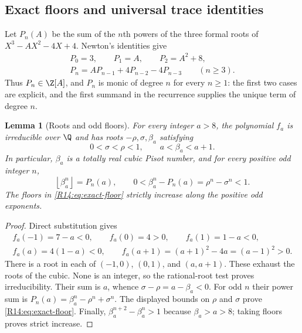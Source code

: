 \documentclass[11pt,a4paper]{article}
\newtheorem{lemma}[theorem]{Lemma}\newtheorem{proposition}[theorem]{Proposition}
\theoremstyle{definition}\newtheorem{definition}[theorem]{Definition}
\theoremstyle{remark}\newtheorem{remark}[theorem]{Remark}
\newcommand{\floor}[1]{\left\lfloor#1\right\rfloor}
\begin{document}
\subsection{Exact floors and universal trace identities}

Let $P_n(A)$ be the sum of the $n$th powers of the three formal roots
of $X^3-AX^2-4X+4$. Newton's identities give
\begin{equation}\label{R14:eq:trace-recurrence}
 \begin{gathered}
 P_0=3,\qquad P_1=A,\qquad P_2=A^2+8,\\
 P_n=A P_{n-1}+4P_{n-2}-4P_{n-3}\qquad(n\ge3).
 \end{gathered}
\end{equation}
Thus $P_n\in\Z[A]$, and $P_n$ is monic of degree $n$ for every
$n\ge1$: the first two cases are explicit, and the first summand
in the recurrence supplies the unique term of degree $n$.

\begin{lemma}[Roots and odd floors]\label{R14:lem:odd-floors}
For every integer $a>8$, the polynomial $f_a$ is irreducible over
$\Q$ and has roots $-\rho,\sigma,\beta_a$ satisfying
\[
 0<\sigma<\rho<1,\qquad a<\beta_a<a+1.
\]
In particular, $\beta_a$ is a totally real cubic Pisot number, and
for every positive odd integer $n$,
\begin{equation}\label{R14:eq:exact-floor}
 \floor{\beta_a^n}=P_n(a),\qquad
 0<\beta_a^n-P_n(a)=\rho^n-\sigma^n<1.
\end{equation}
The floors in \eqref{R14:eq:exact-floor} strictly increase along the
positive odd exponents.
\end{lemma}

\begin{proof}
Direct substitution gives
\[
 \begin{gathered}
 f_a(-1)=7-a<0,\qquad f_a(0)=4>0,\qquad f_a(1)=1-a<0,\\
 f_a(a)=4(1-a)<0,\qquad
 f_a(a+1)=(a+1)^2-4a=(a-1)^2>0.
 \end{gathered}
\]
There is a root in each of $(-1,0)$, $(0,1)$, and $(a,a+1)$.
These exhaust the roots of the cubic. None is an integer, so the
rational-root test proves irreducibility. Their sum is $a$, whence
$\sigma-\rho=a-\beta_a<0$. For odd $n$ their power sum is
$P_n(a)=\beta_a^n-\rho^n+\sigma^n$. The displayed bounds on
$\rho$ and $\sigma$ prove \eqref{R14:eq:exact-floor}. Finally,
$\beta_a^{n+2}-\beta_a^n>1$ because $\beta_a>a>8$; taking
floors proves strict increase.
\end{proof}
\end{document}
